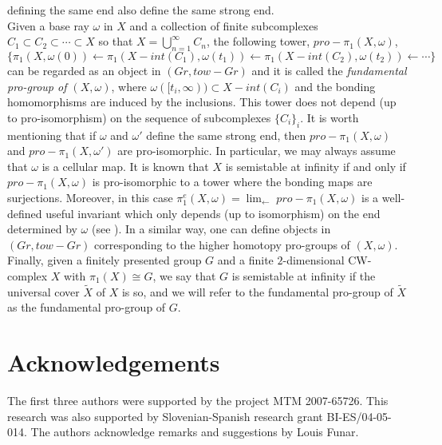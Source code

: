 \documentclass{amsart}[12pt]
\theoremstyle{definition}
\theoremstyle{remark}
\numberwithin{equation}{section}
\begin{document}
defining the same end also define the same strong end.\\
\indent Given a base ray $\omega$ in $X$ and a collection of
finite subcomplexes $C_1 {\subset} C_2 {\subset} \cdots {\subset} X$ so that $X =
\bigcup_{n=1}^{\infty} C_n$, the following tower, $pro-\pi_1(X,
\omega)$,
$$ \{ \pi_1(X, \omega(0)) \leftarrow \pi_1(X - int(C_1), \omega(t_1))
\leftarrow \pi_1(X - int(C_2), \omega(t_2)) \leftarrow \cdots \}$$
can be regarded as an object in $(Gr, tow-Gr)$ and it is called
the {\it fundamental pro-group of $(X, \omega)$}, where
$\omega([t_i, \infty)) {\subset} X - int(C_i)$ and the bonding
homomorphisms are induced by the inclusions. This tower does not
depend (up to pro-isomorphism) on the sequence of subcomplexes
$\{C_i\}_i$. It is worth mentioning that if $\omega$ and $\omega'$
define the same strong end, then  $pro-\pi_1(X, \omega)$ and
$pro-\pi_1(X, \omega')$ are pro-isomorphic. In particular, we may
always assume that $\omega$ is a cellular map. It is known that
$X$ is semistable at infinity if and only if $pro-\pi_1(X,
\omega)$ is pro-isomorphic to a tower where the bonding maps are
surjections. Moreover, in this case $\pi^{e}_1(X, \omega) =
{\displaystyle \lim_{\longleftarrow}} \; pro-\pi_1(X, \omega)$ is a well-defined useful
invariant which only depends (up to isomorphism) on the end
determined by $\omega$ (see \cite{GM2}). In a similar way, one can
define objects in $(Gr, tow-Gr)$ corresponding to the higher
homotopy pro-groups of
$(X, \omega)$.\\
\indent Finally, given a finitely presented group $G$ and a finite
$2$-dimensional CW-complex $X$ with $\pi_1(X) \cong G$, we say
that $G$ is semistable at infinity if the universal cover
$\tilde{X}$ of $X$ is so, and we will refer to the fundamental
pro-group of $\tilde{X}$ as the fundamental pro-group of $G$.

\section*{Acknowledgements}
The first three authors were supported by the project MTM
2007-65726. This research was also supported by Slovenian-Spanish
research grant BI-ES/04-05-014. The authors acknowledge remarks
and suggestions by Louis Funar.
\end{document}

